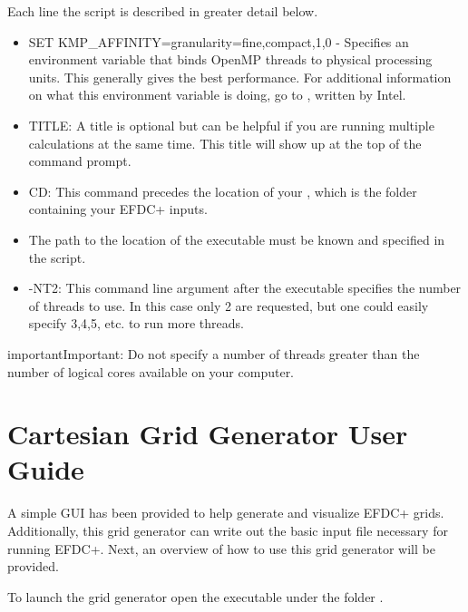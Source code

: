 \documentclass[letterpaper,10pt,english]{sphinxmanual}
\begin{document}
Each line the script is described in greater detail below.
\begin{itemize}
\item {} 
SET KMP\_AFFINITY=granularity=fine,compact,1,0 - Specifies an environment variable that binds OpenMP threads to physical processing units. This generally gives the best performance.  For additional information on what this environment variable is doing, go to , written by Intel.

\item {} 
TITLE: A title is optional but can be helpful if you are running multiple calculations at the same time.  This title will show up at the top of the command prompt.

\item {} 
CD: This command precedes the location of your , which is the folder containing your EFDC+ inputs.

\item {} 
The path to the location of the executable must be known and specified in the script.

\item {} 
-NT2: This command line argument after the executable specifies the number of threads to use.  In this case only 2 are requested, but one could easily specify 3,4,5, etc. to run more threads.

\end{itemize}

\begin{sphinxadmonition}{important}{Important:}
Do not specify a number of threads greater than the number of logical cores available on your computer.
\end{sphinxadmonition}


\section{Cartesian Grid Generator User Guide}
\label{\detokenize{gridgen/index:cartesian-grid-generator-user-guide}}\label{\detokenize{gridgen/index:gridgen}}\label{\detokenize{gridgen/index::doc}}
A simple GUI has been provided to help generate and visualize EFDC+ grids.  Additionally, this grid generator can write out the basic input file necessary for running EFDC+.  Next, an overview of how to use this grid generator will be provided.

To launch the grid generator open the  executable under the folder .
\end{document}
